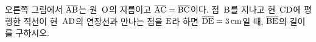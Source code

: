 \noindent\begin{minipage}[t]{0.58\linewidth}\vspace{0pt}\raggedright 오른쪽 그림에서 $\overline{\mathrm{AB}}$는 원~$\mathrm{O}$의 지름이고 $\overline{\mathrm{AC}}=\overline{\mathrm{BC}}$이다. 점~$\mathrm{B}$를 지나고 현~$\mathrm{CD}$에 평행한 직선이 현~$\mathrm{AD}$의 연장선과 만나는 점을 $\mathrm{E}$라 하면 $\overline{\mathrm{DE}}=3\,\mathrm{cm}$일 때, $\overline{\mathrm{BE}}$의 길이를 구하시오.\end{minipage}\hfill\begin{minipage}[t]{0.4\linewidth}\vspace{0pt}\centering \resizebox{\ifdim\width>\linewidth\linewidth\else\width\fi}{!}{}\end{minipage}\par
